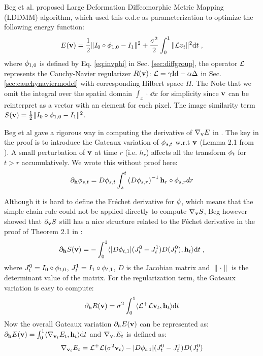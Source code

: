 \documentclass[letterpaper,12pt]{article}
\begin{document}
Beg et al. proposed Large Deformation Diffeomorphic Metric Mapping (LDDMM) algorithm, which used this o.d.e as parameterization to optimize the following energy function:
\begin{align}
E(\mathbf{v}) = \frac{1}{2} \| I_0 \circ \phi_{1,0} - I_1 \|^2 
+ 
\frac{\sigma^2}{2}\int_{0}^{1} \| \mathcal{L} v_t\|^2 \text{d} t \;,
\label{eq:lddmm}
\end{align}
where $\phi_{1,0}$ is defined by Eq. \ref{eq:invphi} in Sec. \ref{sec:diffgroup}, the operator $\mathcal{L}$ represents the Cauchy-Navier regularizer $R(\mathbf{v})$: $\mathcal{L} = \gamma \text{Id} - \alpha \Delta$ in Sec. \ref{sec:cauchynaviermodel} with corresponding Hilbert space $H$. The 
Note that we omit the integral over the spatial domain $\int_x \cdot\, \dd x$ for simplicity since $\mathbf{v}$ can be reinterpret as a vector with an element for each pixel. 
The image similarity term $S(\mathbf{v}) = \frac{1}{2} \| I_0 \circ \phi_{1,0} - I_1 \|^2 $.

Beg et al gave a rigorous way in computing the derivative of $\nabla_{\mathbf{v}} E$ in \cite{Beg2005Computing}. The key in the proof is to introduce the Gateaux variation of $\phi_{s,t}$ w.r.t $\mathbf{v}$ (Lemma 2.1 from \cite{Beg2005Computing}). A small perturbation of $\mathbf{v}$ at time $r$ (i.e. $h_r$) affects all the transform $\phi_t$ for $t>r$ accumulatively. 
We wrote this without proof here:
\begin{align}
\partial_{\mathbf{h}} \phi_{s,t} = D\phi_{s,t} 
\int_{s}^{t} 
\left( 
D \phi_{s,r}
\right)
^{-1} \mathbf{h}_r \circ \phi_{s, r} dr
\end{align}


Although it is hard to define the Fr{\'e}chet derivative for $\phi$, which means that the simple chain rule could not be applied directly to compute $\nabla_{\mathbf{v}} S$, Beg however showed that $\partial_{\mathbf{v}} S$ still has a nice structure related to the F\'echet derivative in the proof of Theorem 2.1 in \cite{Beg2005Computing}:
\begin{align}
\partial_{\mathbf{h}} S(\mathbf{v}) = - \int_{0}^{1} 
\langle
|D\phi_{t,1}|
(J_t^0 - J_t^1)
D(J_t^0)
,
\mathbf{h}_t
\rangle
\text{d} t \; ,
\label{eq:lddmmds}
\end{align}
where $J_t^0 = I_{0}\circ \phi_{t,0}$, $J_t^1 = I_{1}\circ \phi_{t,1}$, $D$ is the Jacobian matrix and $\| \cdot \|$ is the determinant value of the matrix.
For the regularization term, the Gateaux variation is easy to compute:
\begin{align}
\partial_{\mathbf{h}} R(\mathbf{v}) = \sigma^2 \int_{0}^{1} 
\langle
\mathcal{L}^+\mathcal{L} \mathbf{v}_t, \mathbf{h}_t
\rangle \text{d} t
\end{align}
Now the overall Gateaux variation $\partial_h E(\mathbf{v})$ can be represented as:
$\partial_{\mathbf{h}} E(\mathbf{v}) = \int_0^1
\langle
\nabla_{\mathbf{v}_t} E_t , \mathbf{h}_t
\rangle \text{d} t $
and $\nabla_{\mathbf{v}_t} E_t$ is defined as:
\begin{align}
\nabla_{\mathbf{v}_t} E_t = \mathcal{L}^+\mathcal{L} (\sigma^2 \mathbf{v}_t) - |D\phi_{t,1}|(J_t^0 - J_t^1)D(J_t^0)
\label{eq:lddmmgrad}
\end{align}
\end{document}
